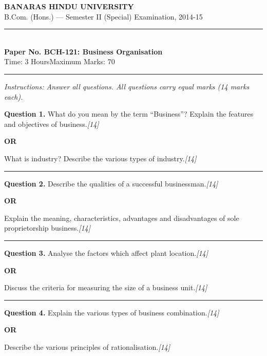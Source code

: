 \documentclass[11pt,a4paper]{article}
\newcommand{\pts}[1]{\hfill   \textit{[#1]}}
\begin{document}
\begin{center}
  {\large\bfseries BANARAS HINDU UNIVERSITY}\\[2pt]
  {\normalsize B.Com. (Hons.) --- Semester II (Special) Examination, 2014-15}\\[6pt]
  \rule{0.8\linewidth}{0.5pt}\\[6pt]
  {\large\bfseries Paper No. BCH-121: Business Organisation}\\[4pt]
  {\normalsize Time: 3 Hours\hfill Maximum Marks: 70}
\end{center}

\rule{\linewidth}{0.4pt}

\smallskip



\noindent   \textit{Instructions: Answer all questions. All questions carry equal marks (14 marks each).}

\bigskip




\noindent   \textbf{Question 1.}
What do you mean by the term ``Business''? Explain the features and objectives of business.\pts{14}

\centerline{   \textbf{OR}}

What is industry? Describe the various types of industry.\pts{14}

\medskip\rule{\linewidth}{0.2pt}




\noindent   \textbf{Question 2.}
Describe the qualities of a successful businessman.\pts{14}

\centerline{   \textbf{OR}}

Explain the meaning, characteristics, advantages and disadvantages of sole proprietorship business.\pts{14}

\medskip\rule{\linewidth}{0.2pt}




\noindent   \textbf{Question 3.}
Analyse the factors which affect plant location.\pts{14}

\centerline{   \textbf{OR}}

Discuss the criteria for measuring the size of a business unit.\pts{14}

\medskip\rule{\linewidth}{0.2pt}




\noindent   \textbf{Question 4.}
Explain the various types of business combination.\pts{14}

\centerline{   \textbf{OR}}

Describe the various principles of rationalisation.\pts{14}
\end{document}

